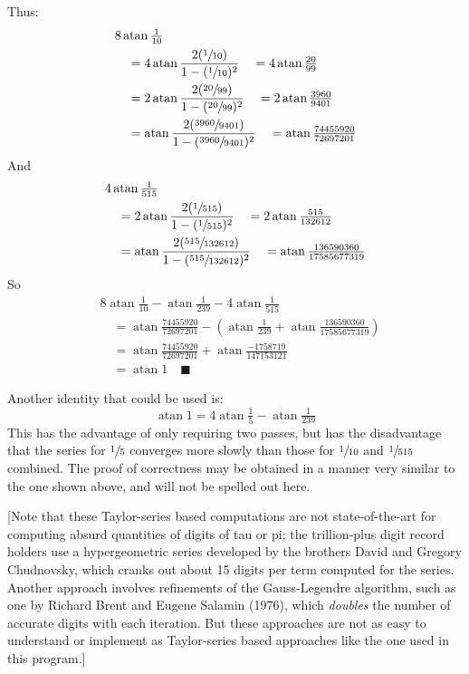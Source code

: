\documentclass{report}
\newcommand{\vbreak}{\vspace{4ex}}
\newcommand{\QED}{\quad\blacksquare}
\DeclareMathOperator{\atan}{atan}
\begin{document}
\vbreak
Thus:
\begin{equation*}
  \begin{aligned}
    & 8 \atan \tfrac{1}{10}  \\
       &\quad= 4 \atan \frac{2(\sfrac{1}{10})}{1 - (\sfrac{1}{10})^2}
         \quad= 4 \atan \tfrac{20}{99} \\
       &\quad= 2 \atan \frac{2(\sfrac{20}{99})}{1 - (\sfrac{20}{99})^2}
         \quad= 2 \atan \tfrac{3960}{9401} \\
       &\quad= \atan \frac{2(\sfrac{3960}{9401})}{1 - (\sfrac{3960}{9401})^2}
         \quad=   \atan \tfrac{74455920}{72697201}
  \end{aligned}
\end{equation*}
And
\begin{equation*}
  \begin{aligned}
    & 4 \atan \tfrac{1}{515} \\
      &\quad= 2 \atan \frac{2(\sfrac{1}{515})}{1 - (\sfrac{1}{515})^2}
        \quad= 2 \atan \tfrac{515}{132612} \\
      &\quad= \atan \frac{2(\sfrac{515}{132612})}{1 - (\sfrac{515}{132612})^2}
        \quad= \atan \tfrac{136590360}{17585677319}
  \end{aligned}
\end{equation*}
So
  \begin{align*}
    & 8 \atan\tfrac{1}{10} - \atan\tfrac{1}{239} - 4 \atan\tfrac{1}{515} \\
      &\quad= \atan\tfrac{74455920}{72697201} - (\atan\tfrac{1}{239} + \atan\tfrac{136590360}{17585677319}) \\
      &\quad= \atan\tfrac{74455920}{72697201} + \atan\tfrac{-1758719}{147153121} \\
      &\quad= \atan 1
      \QED
  \end{align*}

\vbreak
Another identity that could be used is:
\begin{equation}\label{atan+5-239}
   \atan 1 = 4 \atan\tfrac{1}{5} - \atan\tfrac{1}{239}
\end{equation}
This has the advantage of only requiring two passes,
but has the disadvantage that
the series for $\sfrac{1}{5}$ converges more slowly
than those for $\sfrac{1}{10}$ and $\sfrac{1}{515}$ combined.
The proof of correctness may be obtained in a manner very similar
to the one shown above,
and will not be spelled out here.

[Note that these Taylor-series based computations are not
state-of-the-art for computing absurd quantities of digits of tau or pi;
the trillion-plus digit record holders use a hypergeometric series
developed by the brothers David and Gregory Chudnovsky,
which cranks out about 15 digits per term computed for the series.
Another approach involves refinements of the Gauss-Legendre algorithm,
such as one by Richard Brent and Eugene Salamin (1976),
which \emph{doubles} the number of accurate digits with each iteration.
But these approaches are not as easy to understand or implement as
Taylor-series based approaches like the one used in this program.]
\end{document}
